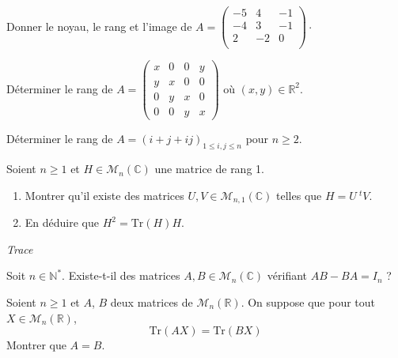 \documentclass[a4paper,10pt]{report}
\begin{document}
\begin{Exercice}{} Donner le noyau, le rang et l'image de $A = \begin{pmatrix}
-5 & 4 & -1 \\
-4 & 3 & - 1 \\
2 	 & -2 & 0 \\
\end{pmatrix}\cdot$
\end{Exercice}

\begin{Exercice}{} Déterminer le rang de $A = \begin{pmatrix}
x & 0 & 0& y \\
y & x & 0 & 0 \\
0 & y & x & 0 \\
0 & 0 & y & x
\end{pmatrix}$ où $(x,y) \in \mathbb{R}^2$.
\end{Exercice} 

\begin{Exercice}{} Déterminer le rang de $A=(i+j+ij)_{1\leq i,j\leq n}$ pour $n \geq 2$.
\end{Exercice} 


\begin{Exercice}{} Soient $n \geq 1$ et $H \in \mathcal{M}_n(\mathbb{C})$ une matrice de rang 1.
    \begin{enumerate}
      \item
        Montrer qu'il existe des matrices $U,V \in \mathcal{M}_{n,1}(\mathbb{C})$ telles que $H = U ~^tV$.
      \item En déduire que $H^2 = \textrm{Tr}(H)H$.
 \end{enumerate}
\end{Exercice}
 \medskip

\begin{center}
\textit{{ {\large Trace}}}
\end{center}

\medskip


\begin{Exercice}{} Soit $n \in \mathbb{N}^*$. Existe-t-il des matrices $A,B \in \mathcal{M}_n(\mathbb{C})$ vérifiant $AB - BA = I_n$ ?
\end{Exercice}


\begin{Exercice}{} Soient $n \geq 1$ et $A$, $B$ deux matrices de $\mathcal{M}_n(\mathbb{R})$. On suppose que pour tout $X \in \mathcal{M}_n(\mathbb{R})$, 
$$\textrm{Tr}(AX)= \textrm{Tr}(BX)$$
Montrer que $A=B$.
\end{Exercice}
\end{document}
